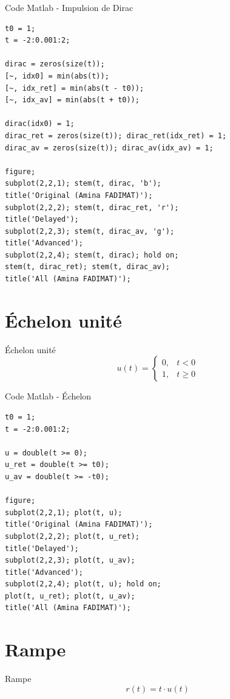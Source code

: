\documentclass[10pt]{beamer}
\begin{document}
\begin{frame}[fragile]{Code Matlab - Impulsion de Dirac}
\begin{lstlisting}
t0 = 1;
t = -2:0.001:2;

dirac = zeros(size(t));
[~, idx0] = min(abs(t));
[~, idx_ret] = min(abs(t - t0));
[~, idx_av] = min(abs(t + t0));

dirac(idx0) = 1;
dirac_ret = zeros(size(t)); dirac_ret(idx_ret) = 1;
dirac_av = zeros(size(t)); dirac_av(idx_av) = 1;

figure;
subplot(2,2,1); stem(t, dirac, 'b');
title('Original (Amina FADIMAT)');
subplot(2,2,2); stem(t, dirac_ret, 'r');
title('Delayed');
subplot(2,2,3); stem(t, dirac_av, 'g');
title('Advanced');
subplot(2,2,4); stem(t, dirac); hold on;
stem(t, dirac_ret); stem(t, dirac_av);
title('All (Amina FADIMAT)');
\end{lstlisting}
\end{frame}

\section{Échelon unité}
\begin{frame}{Échelon unité}
$$u(t)=\begin{cases}0, & t<0 \\ 1, & t\ge0\end{cases}$$
\end{frame}

\begin{frame}[fragile]{Code Matlab - Échelon}
\begin{lstlisting}
t0 = 1;
t = -2:0.001:2;

u = double(t >= 0);
u_ret = double(t >= t0);
u_av = double(t >= -t0);

figure;
subplot(2,2,1); plot(t, u);
title('Original (Amina FADIMAT)');
subplot(2,2,2); plot(t, u_ret);
title('Delayed');
subplot(2,2,3); plot(t, u_av);
title('Advanced');
subplot(2,2,4); plot(t, u); hold on;
plot(t, u_ret); plot(t, u_av);
title('All (Amina FADIMAT)');
\end{lstlisting}
\end{frame}

\section{Rampe}
\begin{frame}{Rampe}
$$r(t)=t \cdot u(t)$$
\end{frame}
\end{document}
